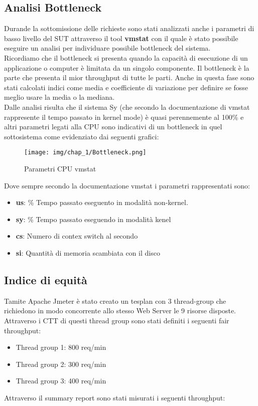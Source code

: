 \subsection{Analisi Bottleneck}
Durande la sottomissione delle richieste sono stati analizzati anche i parametri di basso livello del SUT attraverso il tool \textbf{vmstat} con il quale è stato possibile eseguire un analisi per individuare possibile bottleneck del sistema.\\
Ricordiamo che il bottleneck si presenta quando la capacità di esecuzione di un applicazione o computer è limitata da un singolo componente. Il bottleneck è la parte che presenta il mior throughput di tutte le parti. 
Anche in questa fase sono stati calcolati indici come media e coefficiente di variazione per definire se fosse meglio usare la media o la mediana.\\
Dalle analisi risulta che il sistema Sy (che secondo la documentazione di vmstat rappresente il tempo passato in kernel mode) è quasi perennemente al 100\% e altri parametri legati alla CPU sono indicativi di un bottleneck in quel sottosistema come evidenziato dai seguenti grafici:
\begin{figure}[H]
    \centering
    \texttt{[image: img/chap\_1/Bottleneck.png]}
    \caption{Parametri CPU vmstat}
    \label{fig:bottleneck}
\end{figure}
Dove sempre secondo la documentazione vmstat i parametri rappresentati sono: 
\begin{itemize}
    \item \textbf{us}: \% Tempo passato eseguento in modalità non-kernel.
    \item \textbf{sy}: \% Tempo passato eseguendo in modalità kenel 
    \item \textbf{cs}: Numero di contex switch al secondo
    \item \textbf{si}: Quantità di memoria scambiata con il disco 
\end{itemize}
\subsection{Indice di equità}
Tamite Apache Jmeter è stato creato un tesplan con 3 thread-group che richiedono in modo concorrente allo stesso Web Server le 9 risorse disposte.\\
Attraverso i CTT di questi thread group sono stati definiti i seguenti fair throughput:
\begin{itemize}
    \item Thread group 1: 800 req/min
    \item Thread group 2: 300 req/min
    \item Thread group 3: 400 req/min
\end{itemize}
Attraverso il summary report sono stati misurati i seguenti throughput:

